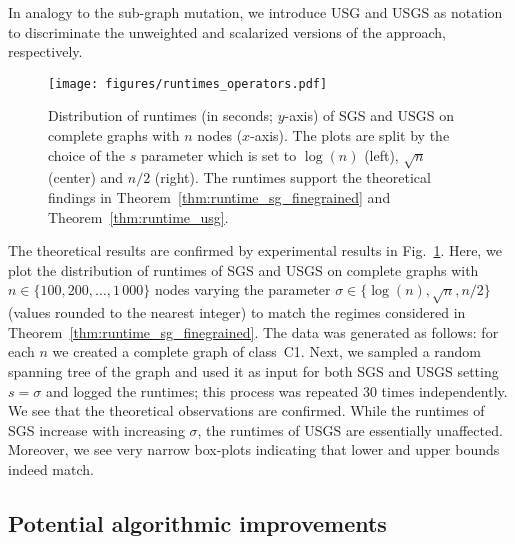 \documentclass[twoside]{article}
\begin{document}
In analogy to the sub-graph mutation, we introduce USG and USGS as notation to discriminate the unweighted and scalarized versions of the approach, respectively.

\begin{figure}
    \centering
    \texttt{[image: figures/runtimes\_operators.pdf]}
    \caption{Distribution of runtimes (in seconds; $y$-axis) of SGS and USGS on complete graphs with $n$ nodes ($x$-axis). The plots are split by the choice of the $s$ parameter which is set to $\log(n)$ (left), $\sqrt{n}$ (center) and $n/2$ (right). The runtimes support the theoretical findings in Theorem~\ref{thm:runtime_sg_finegrained} and Theorem~\ref{thm:runtime_usg}.}
    \label{fig:runtimes_operators}
\end{figure}
The theoretical results are confirmed by experimental results in Fig.~\ref{fig:runtimes_operators}. Here, we plot the distribution of runtimes of SGS and USGS on complete graphs with $n \in \{100, 200, \ldots, 1\,000\}$ nodes varying the parameter $\sigma \in \{\log(n), \sqrt{n}, n/2\}$ (values rounded to the nearest integer) to match the regimes considered in Theorem~\ref{thm:runtime_sg_finegrained}.
The data was generated as follows: for each $n$ we created a complete graph of class~C1. Next, we sampled a random spanning tree of the graph and used it as input for both SGS and USGS setting $s = \sigma$ and logged the runtimes; this process was repeated 30 times independently.
We see that the theoretical observations are confirmed. While the runtimes of SGS increase with increasing $\sigma$, the runtimes of USGS are essentially unaffected. Moreover, we see very narrow box-plots indicating that lower and upper bounds indeed match.

\subsection{Potential algorithmic improvements}
\end{document}
